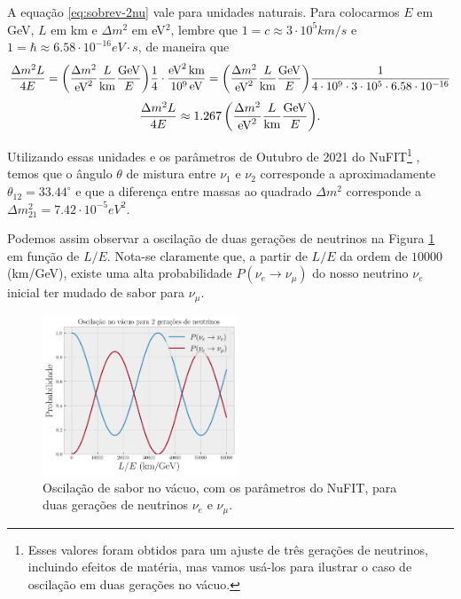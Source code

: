 \documentclass[12pt]{report}
\begin{document}
A equação \ref{eq:sobrev-2nu} vale para unidades naturais. Para colocarmos $E$ em GeV, $L$ em km e $\Delta m^2$ em eV$^2$, lembre que $1 = c \approx 3 \cdot 10^5 \unit{km/s}$ e $1 = \hbar \approx 6.58 \cdot 10^{-16} \unit{eV \cdot s}$, de maneira que
$$
\frac{\Delta m^2 L}{4E} = \qty(\frac{\Delta m^2}{\text{eV}^2} \frac{L}{\text{km}} \frac{\text{GeV}}{E})
\frac{1}{4} \cdot \frac{\text{eV}^2 \, \text{km}}{10^9 \, \text{eV}} =
\qty(\frac{\Delta m^2}{\text{eV}^2} \frac{L}{\text{km}} \frac{\text{GeV}}{E})
\frac{1}{4 \cdot 10^9 \cdot 3 \cdot 10^5 \cdot 6.58 \cdot 10^{-16}}
$$
\begin{equation}
\frac{\Delta m^2 L}{4E} \approx 1.267 \, \qty(\frac{\Delta m^2}{\text{eV}^2} \frac{L}{\text{km}} \frac{\text{GeV}}{E}).
\end{equation}

Utilizando essas unidades e os parâmetros de Outubro de 2021 do NuFIT\footnote{Esses valores foram obtidos para um ajuste de três gerações de neutrinos, incluindo efeitos de matéria, mas vamos usá-los para ilustrar o caso de oscilação em duas gerações no vácuo.} \cite{nufit}, temos que o ângulo $\theta$ de mistura entre $\nu_1$ e $\nu_2$ corresponde a aproximadamente $\theta_{12} = 33.44^\circ$ e que a diferença entre massas ao quadrado $\Delta m^2$ corresponde a $\Delta m_{21}^2 = 7.42 \cdot 10^{-5} \unit{eV^2}$.

Podemos assim observar a oscilação de duas gerações de neutrinos na Figura \ref{fig:2nu-vacuo} em função de $L/E$. Nota-se claramente que, a partir de $L / E$ da ordem de $10000$ (km/GeV), existe uma alta probabilidade $P(\nu_e \to \nu_\mu)$ do nosso neutrino $\nu_e$ inicial ter mudado de sabor para $\nu_\mu$.

\begin{figure}[H]
\centering
\includegraphics[width=0.52\textwidth]{fig/2nu-vacuo.png}
\caption{Oscilação de sabor no vácuo, com os parâmetros do NuFIT, para duas gerações de neutrinos $\nu_e$ e $\nu_\mu$.}
\label{fig:2nu-vacuo}
\end{figure}
\end{document}
